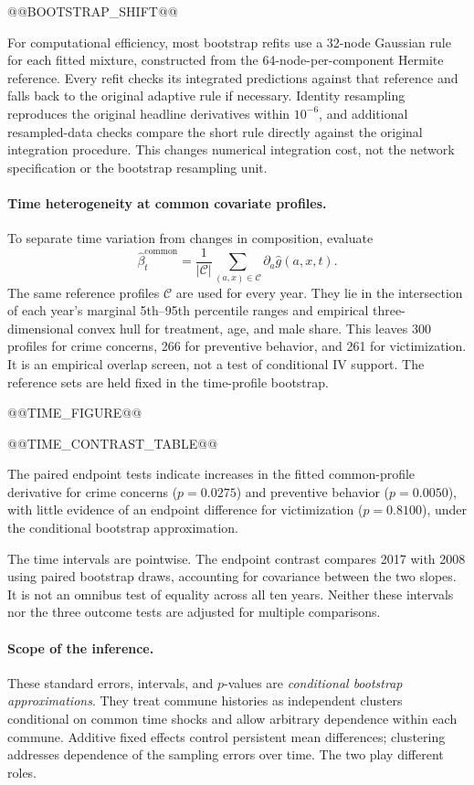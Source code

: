 @@BOOTSTRAP_SHIFT@@

For computational efficiency, most bootstrap refits use a 32-node Gaussian rule for each fitted mixture, constructed from the 64-node-per-component Hermite reference. Every refit checks its integrated predictions against that reference and falls back to the original adaptive rule if necessary. Identity resampling reproduces the original headline derivatives within $10^{-6}$, and additional resampled-data checks compare the short rule directly against the original integration procedure. This changes numerical integration cost, not the network specification or the bootstrap resampling unit.

\paragraph{Time heterogeneity at common covariate profiles.}
To separate time variation from changes in composition, evaluate
\begin{equation}
\widehat\beta_t^{\mathrm{common}}
=\frac1{|\mathcal C|}\sum_{(a,x)\in\mathcal C}\partial_a\widehat g(a,x,t).
\end{equation}
The same reference profiles $\mathcal C$ are used for every year. They lie in the intersection of each year's marginal 5th--95th percentile ranges and empirical three-dimensional convex hull for treatment, age, and male share. This leaves 300 profiles for crime concerns, 266 for preventive behavior, and 261 for victimization. It is an empirical overlap screen, not a test of conditional IV support. The reference sets are held fixed in the time-profile bootstrap.

@@TIME_FIGURE@@

@@TIME_CONTRAST_TABLE@@

The paired endpoint tests indicate increases in the fitted common-profile derivative for crime concerns ($p=0.0275$) and preventive behavior ($p=0.0050$), with little evidence of an endpoint difference for victimization ($p=0.8100$), under the conditional bootstrap approximation.

The time intervals are pointwise. The endpoint contrast compares 2017 with 2008 using paired bootstrap draws, accounting for covariance between the two slopes. It is not an omnibus test of equality across all ten years. Neither these intervals nor the three outcome tests are adjusted for multiple comparisons.

\paragraph{Scope of the inference.}
These standard errors, intervals, and $p$-values are \emph{conditional bootstrap approximations}. They treat commune histories as independent clusters conditional on common time shocks and allow arbitrary dependence within each commune. Additive fixed effects control persistent mean differences; clustering addresses dependence of the sampling errors over time. The two play different roles.

